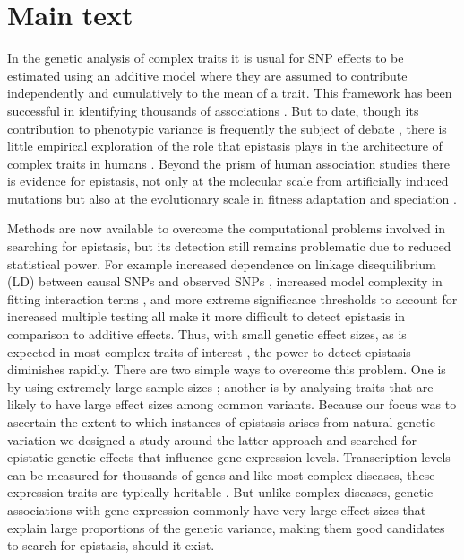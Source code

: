 \documentclass{article}
\begin{document}
\section*{Main text}

In the genetic analysis of complex traits it is usual for SNP effects to be estimated using an additive model where they are assumed to contribute independently and cumulatively to the mean of a trait. This framework has been successful in identifying thousands of associations \cite{Visscher2012}. But to date, though its contribution to phenotypic variance is frequently the subject of debate \cite{Carlborg2004, Hill2008a, Crow2010}, there is little empirical exploration of the role that epistasis plays in the architecture of complex traits in humans \cite{Strange2010, Evans2011}. Beyond the prism of human association studies there is evidence for epistasis, not only at the molecular scale from artificially induced mutations \cite{Costanzo2010} but also at the evolutionary scale in fitness adaptation \cite{Weinreich2006} and speciation \cite{Breen2012}.

Methods are now available to overcome the computational problems involved in searching for epistasis, but its detection still remains problematic due to reduced statistical power. For example increased dependence on linkage disequilibrium (LD) between causal SNPs and observed SNPs \cite{Weir2008, Hemani2013}, increased model complexity in fitting interaction terms \cite{Marchini2005}, and more extreme significance thresholds to account for increased multiple testing \cite{Cordell2009} all make it more difficult to detect epistasis in comparison to additive effects. Thus, with small genetic effect sizes, as is expected in most complex traits of interest \cite{Visscher2012}, the power to detect epistasis diminishes rapidly. There are two simple ways to overcome this problem. One is by using extremely large sample sizes \cite{LangoAllen2010}; another is by analysing traits that are likely to have large effect sizes among common variants. Because our focus was to ascertain the extent to which instances of epistasis arises from natural genetic variation we designed a study around the latter approach and searched for epistatic genetic effects that influence gene expression levels. Transcription levels can be measured for thousands of genes and like most complex diseases, these expression traits are typically heritable \cite{Schadt2003}. But unlike complex diseases, genetic associations with gene expression commonly have very large effect sizes that explain large proportions of the genetic variance\cite{Powell2013}, making them good candidates to search for epistasis, should it exist.
\end{document}
